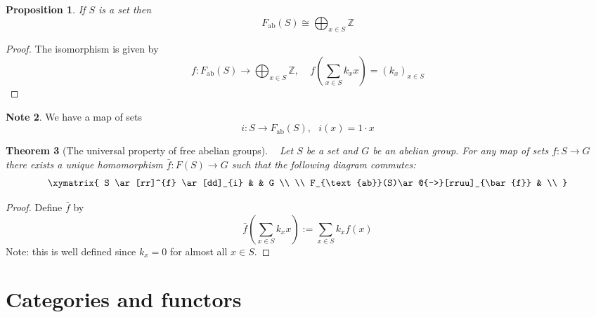 \documentclass[12pt, letterpaper, oneside]{article}
\theoremstyle{plain}
\newtheorem{theorem}{Theorem}[section]
\newtheorem{proposition}[theorem]{Proposition}
\theoremstyle{definition}
\newtheorem{note}[theorem]{Note}
\newcommand{\Z}{{\mathbb Z}}
\newcommand{\vs}{\vskip 5mm}
\begin{document}
\vs\vs

\begin{proposition}
If $S$ is a set then 
$$ F_{\text{ab}}(S) \cong \bigoplus_{x\in S} \Z$$
\end{proposition}

\begin{proof}
The isomorphism is given by 
$$f\colon F_{\text{ab}}(S) \to \bigoplus_{x\in S} \Z,  \ \ \ \ \ f(\sum_{x\in S}k_{x}x) = (k_{x})_{x\in S}$$
\end{proof}

\vs

\begin{note}
We have a map of sets 
$$i\colon S \to F_{\text{ab}}(S), \ \ \ i(x) = 1\cdot x$$
\end{note}

\vs\vs


\begin{theorem}[The universal property of free abelian groups] \ \newline
\label{THM_UNIVPROPFREEGPS}
Let $S$ be a set and $G$ be an abelian group. For any map of sets $f\colon S \to G$
there exists a unique homomorphism $\bar f\colon F(S) \to G$ such that the 
following diagram commutes:
$$
\xymatrix{
S \ar[rr]^{f} \ar[dd]_{i} & & G \\
\\
F_{\text{ab}}(S)\ar@{-->}[rruu]_{\bar{f}} & \\
}
$$
\end{theorem}


\begin{proof}
Define $\bar{f}$ by 
$$\bar{f}\left(\sum_{x\in S} k_{x}x \right) := \sum_{x\in S} k_{x}f(x)$$ 
Note: this is well defined since $k_{x}=0$ for almost all $x\in S$. 
\end{proof}





\newpage
\section{Categories and functors}
\label{SEC_CATFUNCT}
\end{document}
